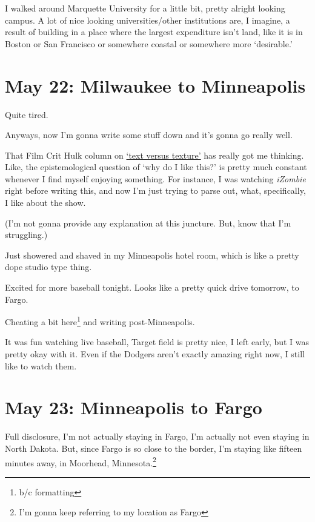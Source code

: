 \documentclass[../butidigress.tex]{subfiles}
\begin{document}
I walked around Marquette University for a little bit, pretty alright looking campus.
A lot of nice looking universities/other institutions are, I imagine, a result of building in a place where the largest expenditure isn't land, like it is in Boston or San Francisco or somewhere coastal or somewhere more `desirable.'

\section{May 22: Milwaukee to Minneapolis}
Quite tired.

Anyways, now I'm gonna write some stuff down and it's gonna go really well.

That Film Crit Hulk column on \href{http://observer.com/2018/05/the-two-crucial-filmmaking-elements-causing-all-your-movie-feuds/}{`text versus texture'} has really got me thinking.
Like, the epistemological question of `why do I like this?' is pretty much constant whenever I find myself enjoying something.
For instance, I was watching \textit{iZombie} right before writing this, and now I'm just trying to parse out, what, specifically, I like about the show.

(I'm not gonna provide any explanation at this juncture.
But, know that I'm struggling.)

\entryskip

Just showered and shaved in my Minneapolis hotel room, which is like a pretty dope studio type thing.

Excited for more baseball tonight.
Looks like a pretty quick drive tomorrow, to Fargo.

Cheating a bit here\footnote{b/c formatting} and writing post-Minneapolis.

It was fun watching live baseball, Target field is pretty nice, I left early, but I was pretty okay with it.
Even if the Dodgers aren't exactly amazing right now, I still like to watch them.

\section{May 23: Minneapolis to Fargo}
Full disclosure, I'm not actually staying in Fargo, I'm actually not even staying in North Dakota.
But, since Fargo is so close to the border, I'm staying like fifteen minutes away, in Moorhead, Minnesota.\footnote{I'm gonna keep referring to my location as Fargo}
\end{document}
